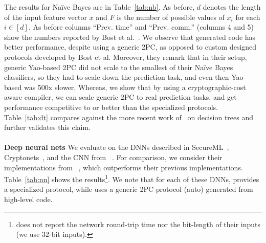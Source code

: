 The results for Na\"{i}ve Bayes are
in Table~\ref{tab:nb}. As before, $d$ denotes the length of the input
feature vector $x$ and $F$ is the number of possible values of $x_i$
for each $i \in [d]$.
As before columns ``Prev. time'' and ``Prev. comm.'' (columns 4 and 5)
show the numbers reported
by Bost et al.~\cite{shafindss}. We observe that \tool generated code
has better performance, despite using a generic 2PC,
as opposed to custom designed protocols developed by Bost et
al. Moreover, they remark that in their setup, generic Yao-based 2PC
did not scale to the smallest of their Na\"{i}ve Bayes classifiers, so
they had to scale down the prediction task, and even then Yao-based \mpc
was 500x slower. Whereas, we show that by using a
cryptographic-cost aware compiler, we can scale generic 2PC to real
prediction tasks, and get performance competitive to or better than the
specialized protocols. Table~\ref{tab:dt} 
compares against the more recent work of~\cite{wu}
on decision trees and further validates this claim.
\\\\
\noindent\textbf{Deep neural nets}
We evaluate \tool on the DNNs described in SecureML~\cite{secureml},
Cryptonets~\cite{cryptonets}, and the CNN from \minion~\cite{minionn}. For
comparison, we consider their implementations from
\minion~\cite{minionn}, which outperforms their previous
implementations. Table~\ref{tab:nn} shows the
results\footnote{\minion does not report the network round-trip time nor the bit-length of their inputs (we use $32$-bit inputs).}.
We note that for each of these DNNs, \minion provides a
specialized protocol, while \tool uses a generic 2PC protocol
(auto) generated from high-level code.

